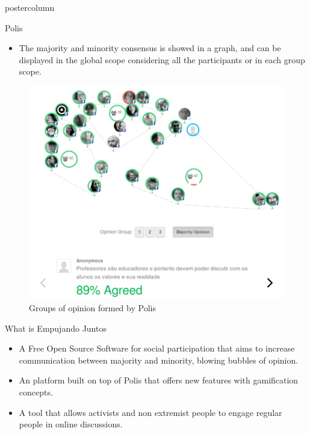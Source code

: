 \documentclass[final,hyperref={pdfpagelabels=false}]{beamer}
\begin{document}
\begin{frame}
\begin{columns}
\begin{column}{.49\textwidth}
\begin{beamercolorbox}[center,wd=\textwidth]{postercolumn}
\begin{minipage}[T]{.95\textwidth}
{\begin{block}{Polis}
\begin{itemize}
    \item The majority and minority consensus is showed in a graph, and can be
    displayed in the global scope considering all the participants or in each group
    scope.
  \end{itemize}

  \begin{figure}
    \begin{center}
      \includegraphics[scale=1.1]{../images/polis3.png}
      \caption{Groups of opinion formed by Polis}
      \label{fig:group-clusters}
    \end{center}
  \end{figure}
\end{block}

\begin{block}{What is Empujando Juntos}

  \begin{itemize}
    \item A Free Open Source Software for social participation that aims to
    increase communication between majority and minority, blowing bubbles of
    opinion.

    \item An platform built on top of Polis that offers new features
    with gamification concepts.
    
    \item A tool that allows activists and non extremist people to engage regular
    people in online discussions.
  \end{itemize}
\end{block}

}
\end{minipage}
\end{beamercolorbox}
\end{column}
\end{columns}
\end{frame}
\end{document}
